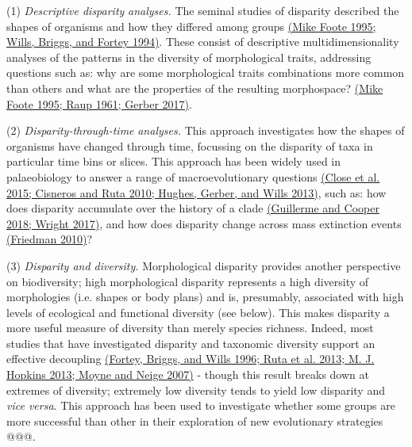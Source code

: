 (1) \emph{Descriptive disparity} \emph{analyses. }The seminal studies of
disparity described the shapes of organisms and how they differed among
groups \href{https://paperpile.com/c/sTGYvp/fTJ3+eZ3F}{(Mike Foote 1995;
Wills, Briggs, and Fortey 1994)}. These consist of descriptive
multidimensionality analyses of the patterns in the diversity of
morphological traits, addressing questions such as: why are some
morphological traits combinations more common than others and what are
the properties of the resulting morphospace?
\href{https://paperpile.com/c/sTGYvp/fTJ3+I0Ic+QVvv}{(Mike Foote 1995;
Raup 1961; Gerber 2017)}.

(2) \emph{Disparity-through-time} \emph{analyses. }This approach
investigates how the shapes of organisms have changed through time,
focussing on the disparity of taxa in particular time bins or slices.
This approach has been widely used in palaeobiology to answer a range of
macroevolutionary questions
\href{https://paperpile.com/c/sTGYvp/PbSx+khc9+xxh5}{(Close et al. 2015;
Cisneros and Ruta 2010; Hughes, Gerber, and Wills 2013)}, such as: how
does disparity accumulate over the history of a clade
\href{https://paperpile.com/c/sTGYvp/ekU4+s33b}{(Guillerme and Cooper
2018; Wright 2017)}, and how does disparity change across mass
extinction events \href{https://paperpile.com/c/sTGYvp/EETc}{(Friedman
2010)}?

(3) \emph{Disparity and diversity. }Morphological disparity provides
another perspective on biodiversity; high morphological disparity
represents a high diversity of morphologies (i.e. shapes or body plans)
and is, presumably, associated with high levels of ecological and
functional diversity (see below). This makes disparity a more useful
measure of diversity than merely species richness. Indeed, most studies
that have investigated disparity and taxonomic diversity support an
effective decoupling
\href{https://paperpile.com/c/sTGYvp/2tbJ+geAO+hea5+aVVj}{(Fortey,
Briggs, and Wills 1996; Ruta et al. 2013; M. J. Hopkins 2013; Moyne and
Neige 2007)} - though this result breaks down at extremes of diversity;
extremely low diversity tends to yield low disparity and \emph{vice
versa}. This approach has been used to investigate whether some groups
are more successful than other in their exploration of new evolutionary
strategies @@@.

